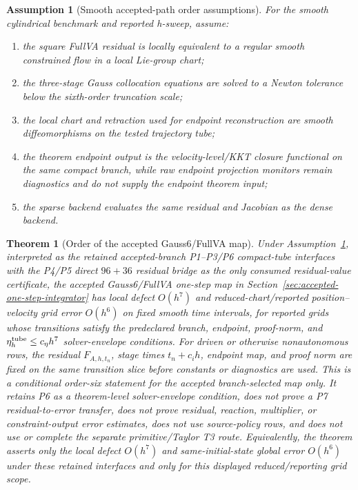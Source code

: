 \documentclass[11pt]{article}
\newtheorem{theorem}{Theorem}
\newtheorem{assumption}{Assumption}
\newcommand{\method}{Gauss6/FullVA}
\begin{document}
\begin{assumption}[Smooth accepted-path order assumptions]
\label{ass:g6fva-order}
For the smooth cylindrical benchmark and reported h-sweep, assume:
\begin{enumerate}
  \item the square FullVA residual is locally equivalent to a regular smooth
  constrained flow in a local Lie-group chart;
  \item the three-stage Gauss collocation equations are solved to a Newton
  tolerance below the sixth-order truncation scale;
  \item the local chart and retraction used for endpoint reconstruction are
  smooth diffeomorphisms on the tested trajectory tube;
  \item the theorem endpoint output is the velocity-level/KKT closure
  functional on the same compact branch, while raw endpoint projection
  monitors remain diagnostics and do not supply the endpoint theorem input;
  \item the sparse backend evaluates the same residual and Jacobian as the
  dense backend.
\end{enumerate}
\end{assumption}

\begin{theorem}[Order of the accepted \method{} map]
\label{thm:g6fullva-order}
Under Assumption~\ref{ass:g6fva-order}, interpreted as the retained
accepted-branch P1--P3/P6 compact-tube interfaces with the P4/P5 direct
\(96+36\) residual bridge as the only consumed residual-value certificate, the
accepted \method{} one-step map in
Section~\ref{sec:accepted-one-step-integrator} has local defect \(O(h^7)\) and
reduced-chart/reported position--velocity grid error \(O(h^6)\) on fixed smooth
time intervals, for reported grids whose transitions satisfy the predeclared
branch, endpoint, proof-norm, and \(\eta_h^{\rm tube}\le c_\eta h^7\)
solver-envelope conditions.  For driven or otherwise nonautonomous rows, the
residual \(F_{A,h,t_n}\), stage times \(t_n+c_i h\), endpoint map, and proof
norm are fixed on the same transition slice before constants or diagnostics
are used.  This is a conditional order-six statement for
the accepted branch-selected map only.  It retains P6 as a theorem-level
solver-envelope condition, does not prove a P7 residual-to-error transfer, does not
prove residual, reaction, multiplier, or constraint-output error estimates,
does not use source-policy rows, and does not use or complete the separate
primitive/Taylor T3 route.  Equivalently, the theorem asserts only the
local defect $O(h^7)$ and same-initial-state global error $O(h^6)$ under these
retained interfaces and only for this displayed reduced/reporting grid scope.
\end{theorem}
\end{document}
